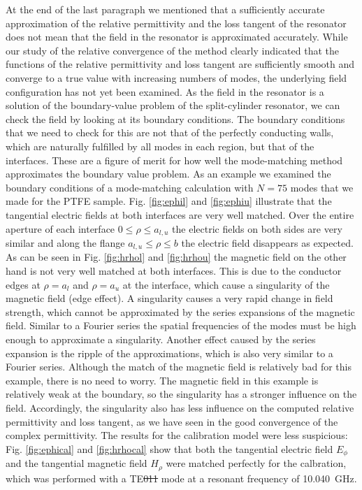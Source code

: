 At the end of the last paragraph we mentioned that a sufficiently accurate approximation of the relative permittivity and the loss tangent of the resonator does not mean that the field in the resonator is approximated accurately. While our study of the relative convergence of the method clearly indicated that the functions of the relative permittivity and loss tangent are sufficiently smooth and converge to a true value with increasing numbers of modes, the underlying field configuration has not yet been examined. As the field in the resonator is a solution of the boundary-value problem of the split-cylinder resonator, we can check the field by looking at its boundary conditions. The boundary conditions that we need to check for this are not that of the perfectly conducting walls, which are naturally fulfilled by all modes in each region, but that of the interfaces. These are a figure of merit for how well the mode-matching method approximates the boundary value problem. As an example we examined the boundary conditions of a mode-matching calculation with $N=75$ modes that we made for the PTFE sample. Fig. \ref{fig:ephil} and \ref{fig:ephiu} illustrate that the tangential electric fields at both interfaces are very well matched. Over the entire aperture of each interface $0\leq\rho\leq a_{l,u}$ the electric fields on both sides are very similar and along the flange $a_{l,u}\leq \rho\leq b$ the electric field disappears as expected. As can be seen in Fig. \ref{fig:hrhol} and \ref{fig:hrhou} the magnetic field on the other hand is not very well matched at both interfaces. This is due to the conductor edges at $\rho=a_l$ and $\rho=a_u$ at the interface, which cause a singularity of the magnetic field (edge effect). A singularity causes a very rapid change in field strength, which cannot be approximated by the series expansions of the magnetic field. Similar to a Fourier series the spatial frequencies of the modes must be high enough to approximate a singularity. Another effect caused by the series expansion is the ripple of the approximations, which is also very similar to a Fourier series. Although the match of the magnetic field is relatively bad for this example, there is no need to worry. The magnetic field in this example is relatively weak at the boundary, so the singularity has a stronger influence on the field. Accordingly, the singularity also has less influence on the computed relative permittivity and loss tangent, as we have seen in the good convergence of the complex permittivity. The results for the calibration model were less suspicious: Fig. \ref{fig:ephical} and \ref{fig:hrhocal} show that both the tangential electric field $E_\phi$ and the tangential magnetic field $H_\rho$ were matched perfectly for the calbration, which was performed with a TE\st{011} mode at a resonant frequency of \SI{10.040}{\giga\hertz}.

